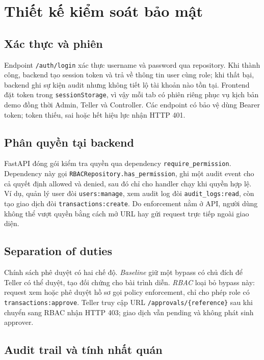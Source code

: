 \chapter{Thiết kế kiểm soát bảo mật}

\section{Xác thực và phiên}

Endpoint \texttt{/auth/login} xác thực username và password qua repository.
Khi thành công, backend tạo session token và trả về thông tin user cùng role;
khi thất bại, backend ghi sự kiện audit nhưng không tiết lộ tài khoản nào tồn
tại. Frontend đặt token trong \texttt{sessionStorage}, vì vậy mỗi tab có phiên
riêng phục vụ kịch bản demo đồng thời Admin, Teller và Controller. Các endpoint
có bảo vệ dùng Bearer token; token thiếu, sai hoặc hết hiệu lực nhận HTTP 401.

\section{Phân quyền tại backend}

FastAPI đóng gói kiểm tra quyền qua dependency \texttt{require\_permission}.
Dependency này gọi \texttt{RBACRepository.has\_permission}, ghi một audit event
cho cả quyết định allowed và denied, sau đó chỉ cho handler chạy khi quyền hợp
lệ. Ví dụ, quản lý user đòi \texttt{users:manage}, xem audit log đòi
\texttt{audit\_logs:read}, còn tạo giao dịch đòi \texttt{transactions:create}.
Do enforcement nằm ở API, người dùng không thể vượt quyền bằng cách mở URL hay
gửi request trực tiếp ngoài giao diện.

\section{Separation of duties}

Chính sách phê duyệt có hai chế độ. \emph{Baseline} giữ một bypass có chủ đích
để Teller có thể duyệt, tạo đối chứng cho bài trình diễn. \emph{RBAC} loại bỏ
bypass này: request xem hoặc phê duyệt hồ sơ gọi policy enforcement, chỉ cho
phép role có \texttt{transactions:approve}. Teller truy cập URL
\texttt{/approvals/\{reference\}} sau khi chuyển sang RBAC nhận HTTP 403; giao
dịch vẫn pending và không phát sinh approver.

\section{Audit trail và tính nhất quán}

